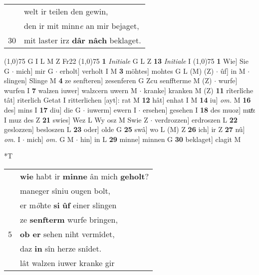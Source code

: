 \documentclass[8pt,a4paper,notitlepage]{article}
\begin{document}
\begin{table}[ht]
\begin{minipage}[t]{0.5\linewidth}
\begin{tabular}{rl}
 & welt ir teilen den gewin,\\ 
 & den ir mit minn\textit{e} an mir bejaget,\\ 
30 & mit laster irz \textbf{dâr nâch} beklaget.\\ 
\end{tabular}
\scriptsize
\line(1,0){75} \newline
G I L M Z Fr22 \newline
\line(1,0){75} \newline
\textbf{1} \textit{Initiale} G L Z  \textbf{13} \textit{Initiale} I  \newline
\line(1,0){75} \newline
\textbf{1} Wie] Sie G  $\cdot$ mich] mir G  $\cdot$ erholt] verholt I M \textbf{3} möhtes] mohtes G L (M) (Z)  $\cdot$ ûf] in M  $\cdot$ slingen] Slinge M \textbf{4} ze senfteren] zesenferen G Zcu senffterme M (Z)  $\cdot$ wurfe] wurfen I \textbf{7} walzen iuwer] walzcern uwern M  $\cdot$ kranke] kranken M (Z) \textbf{11} rîterlîche tât] riterlich Getat I ritterlichen [ayt]: rat M \textbf{12} hât] enhat I M \textbf{14} iu] \textit{om.} M \textbf{16} des] mins I \textbf{17} diu] die G  $\cdot$ iuwerm] ewern I  $\cdot$ ersehen] gesehen I \textbf{18} des muoz] muͤz I muz des Z \textbf{21} swies] Wez L Wy osz M Swie Z  $\cdot$ verdrozzen] erdroszen L \textbf{22} geslozzen] besloszen L \textbf{23} oder] olde G \textbf{25} swâ] wo L (M) Z \textbf{26} ich] ir Z \textbf{27} nû] \textit{om.} I  $\cdot$ mich] \textit{om.} G M  $\cdot$ hin] in L \textbf{29} minne] minnen G \textbf{30} beklaget] clagit M \newline
\end{minipage}
\hspace{0.5cm}
\begin{minipage}[t]{0.5\linewidth}
\small
\begin{center}*T
\end{center}
\begin{tabular}{rl}
 & \textbf{wie} habt ir \textbf{minne} ân mich \textbf{geholt}?\\ 
 & maneger sîniu ougen bolt,\\ 
 & er m\textit{ö}hte \textbf{si} \textbf{ûf} einer slingen\\ 
 & ze \textbf{senfterm} wurfe bringen,\\ 
5 & \textbf{ob er} sehen niht vermîdet,\\ 
 & daz \textbf{in} sîn herze snîdet.\\ 
 & lât walzen iuwer kranke gir\\ 

\end{tabular}
\end{minipage}
\end{table}
\end{document}
